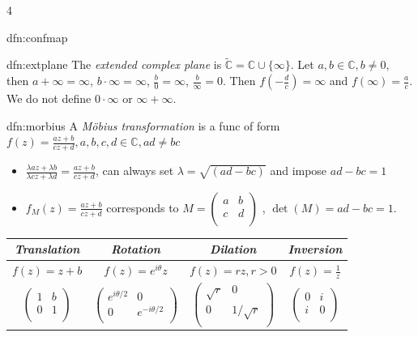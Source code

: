 \documentclass[landscape, 8pt]{extarticle}
\begin{document}
\begin{multicols*}{4}
\begin{dfn}{dfn:confmap}{ }
	\end{dfn}
	
	
	\begin{dfn}{dfn:extplane}{ }
		The \textit{extended complex plane} is $\tilde{\mathbb{C}} = \mathbb{C} \cup \{\infty\}$. Let $a, b \in \mathbb{C}, b \ne 0$, then $a + \infty = \infty$, $b \cdot \infty = \infty$, $\frac{b}{0} = \infty$, $\frac{b}{\infty} = 0$.	Then $f(-\frac{d}{c}) = \infty$ and $f(\infty) = \frac{a}{c}$. We do not define $0 \cdot \infty$ or $\infty + \infty$.
		
	\end{dfn}
	
	
	\begin{dfn}{dfn:morbius}{ }
		A \textit{M{\"o}bius transformation} is a func of form $f(z) = \frac{az + b}{cz + d}, a, b, c, d \in \mathbb{C}, ad \ne bc$
		\begin{itemize}
			\item $\frac{\lambda az + \lambda b}{\lambda cz + \lambda d} = \frac{az + b}{cz + d}$, can always set $ \lambda = \sqrt{(ad - bc)}$ and impose $ad - bc = 1$
			\item $f_M(z) = \frac{az + b}{cz + d}$ corresponds to $M = 
			\begin{pmatrix}
				a&b\\
				c&d\\
			\end{pmatrix}$ 
			, $\det(M) = ad - bc = 1$.
			
		\end{itemize}
			
			\begin{tabular}{|c|c|c|c|}
				\hline 
				\textit{Translation} & \textit{Rotation} & \textit{Dilation} & \textit{Inversion} \\ 
				\hline
				$f(z) = z+b$ & $f(z) = e^{i\theta}z$ & $f(z) = rz, r> 0$ & $f(z) = \frac{1}{z}$ \\ 
				\hline
				$\begin{pmatrix}
					1&b\\
					0&1\\
				\end{pmatrix}$
				&
				$\begin{pmatrix}
					e^{i\theta/2}&0\\
					0&e^{-i\theta/2}\\
				\end{pmatrix}$
				&
				$\begin{pmatrix}
					\sqrt{r}&0\\
					0&1/\sqrt{r}\\
				\end{pmatrix}$
				&
				$\begin{pmatrix}
					0&i\\
					i&0\\
				\end{pmatrix}$
				\\
				\hline
				

\end{tabular}
\end{dfn}
\end{multicols*}
\end{document}
